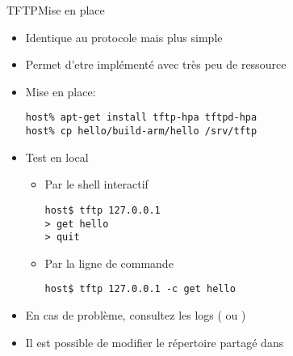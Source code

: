 \begin{frame}[fragile=singleslide]{TFTP}{Mise en place}
  \begin{itemize}
  \item Identique au protocole  mais plus simple
  \item Permet d'etre implémenté avec très peu de ressource
  \item Mise en place:
    \begin{lstlisting}
host% apt-get install tftp-hpa tftpd-hpa
host% cp hello/build-arm/hello /srv/tftp
    \end{lstlisting}
  \item Test en local
    \begin{itemize}
    \item Par le shell interactif
      \begin{lstlisting}
host$ tftp 127.0.0.1
> get hello
> quit
      \end{lstlisting}
    \item Par la ligne de commande
      \begin{lstlisting}
host$ tftp 127.0.0.1 -c get hello
      \end{lstlisting} %
    \end{itemize}
  \item En cas de  problème, consultez les logs (
    ou )
  \item  Il  est  possible  de  modifier le  répertoire  partagé  dans
  \end{itemize}
\end{frame}

